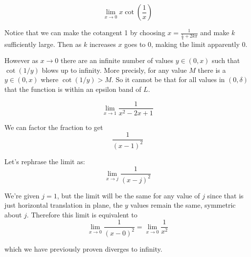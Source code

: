 \documentclass{article}
\begin{document}
\begin{problem}
$$\lim\limits_{x\to 0} x \cot \left(\frac{1}{x}\right)$$
\end{problem}

Notice that we can make the cotangent 1 by choosing $x = \frac{1}{\frac{\pi}{4} + 2k\pi}$ and make $k$ sufficiently large. Then as $k$ increases $x$ goes to 0, making the limit apparently 0.

However as $x \to 0$ there are an infinite number of values $y \in (0, x)$ such that $\cot(1/y)$ blows up to infinity. More precisly, for any value $M$ there is a $y \in (0, x)$ where $\cot(1/y) > M$. So it cannot be that for all values in $(0, \delta)$ that the function is within an epsilon band of $L$.

\begin{problem}
$$\lim\limits_{x \to 1} \frac{1}{x^2 - 2x + 1}$$
\end{problem}

We can factor the fraction to get
$$\frac{1}{(x - 1)^2}$$

Let's rephrase the limit as:
$$\lim_{x \to j} \frac{1}{(x - j)^2}$$

We're given $j = 1$, but the limit will be the same for any value of $j$ since that is just horizontal translation in plane, the $y$ values remain the same, symmetric about $j$. Therefore this limit is equivalent to
$$\lim_{x \to 0} \frac{1}{(x - 0)^2} = \lim_{x \to 0} \frac{1}{x^2}$$

which we have previously proven diverges to infinity.
\end{document}
